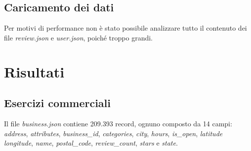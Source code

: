 \documentclass[12pt]{article}
\begin{document}
\subsection{Caricamento dei dati}
Per motivi di performance non è stato possibile analizzare tutto il contenuto dei file \textit{review.json} e \textit{user.json}, poiché troppo grandi.

\section{Risultati}

\subsection{Esercizi commerciali}
Il file \textit{business.json} contiene 209.393 record, ognuno composto da 14 campi: \textit{address}, \textit{attributes}, \textit{business\_id},	\textit{categories}, \textit{city}, \textit{hours}, \textit{is\_open},	\textit{latitude} \textit{longitude}, \textit{name}, \textit{postal\_code}, \textit{review\_count}, \textit{stars} e \textit{state}.
\end{document}
